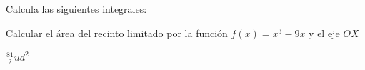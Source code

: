 \documentclass[addpoints,spanish, 12pt,a4paper]{exam}
\begin{document}
\begin{questions}


\question Calcula las siguientes integrales:

\question[2]   Calcular el área del recinto limitado por la función $f(x)=x^3-9x$ y el eje $OX$
\begin{solution}
    $\frac{81}{2}ud^2$
\end{solution}   

\addpoints



\end{questions}
\end{document}

